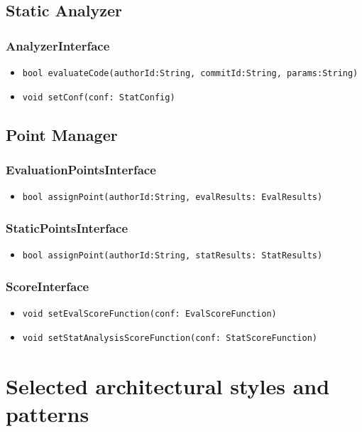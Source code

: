 \subsection{Static Analyzer}
\subsubsection{AnalyzerInterface}
\begin{itemize}
    \item \texttt{bool evaluateCode(authorId:String, commitId:String, params:String)}
    \item \texttt{void setConf(conf: StatConfig)}
\end{itemize}

\subsection{Point Manager}
\subsubsection{EvaluationPointsInterface}
\begin{itemize}
    \item \texttt{bool assignPoint(authorId:String, evalResults: EvalResults)}
\end{itemize}

\subsubsection{StaticPointsInterface}
\begin{itemize}
    \item \texttt{bool assignPoint(authorId:String, statResults: StatResults)}
\end{itemize}

\subsubsection{ScoreInterface}
\begin{itemize}
    \item \texttt{void setEvalScoreFunction(conf: EvalScoreFunction)}
    \item \texttt{void setStatAnalysisScoreFunction(conf: StatScoreFunction)}
\end{itemize}

\newpage

\section{Selected architectural styles and patterns}
\label{s:selected-architectural-styles-and-patterns}%

